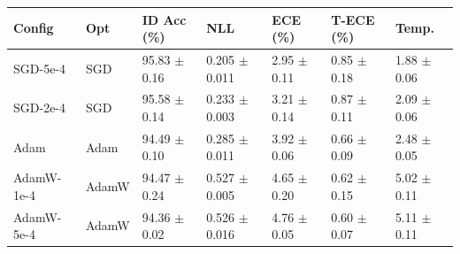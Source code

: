 \begin{tabularx}{\linewidth}{@{}l l Z Z Z Z Z@{}}
\toprule
Config & Opt & ID Acc (\%) & NLL & ECE (\%) & T-ECE (\%) & Temp. \\
\midrule
SGD-5e-4 & SGD & 95.83 $\pm$ 0.16 & 0.205 $\pm$ 0.011 & 2.95 $\pm$ 0.11 & 0.85 $\pm$ 0.18 & 1.88 $\pm$ 0.06 \\
SGD-2e-4 & SGD & 95.58 $\pm$ 0.14 & 0.233 $\pm$ 0.003 & 3.21 $\pm$ 0.14 & 0.87 $\pm$ 0.11 & 2.09 $\pm$ 0.06 \\
Adam & Adam & 94.49 $\pm$ 0.10 & 0.285 $\pm$ 0.011 & 3.92 $\pm$ 0.06 & 0.66 $\pm$ 0.09 & 2.48 $\pm$ 0.05 \\
AdamW-1e-4 & AdamW & 94.47 $\pm$ 0.24 & 0.527 $\pm$ 0.005 & 4.65 $\pm$ 0.20 & 0.62 $\pm$ 0.15 & 5.02 $\pm$ 0.11 \\
AdamW-5e-4 & AdamW & 94.36 $\pm$ 0.02 & 0.526 $\pm$ 0.016 & 4.76 $\pm$ 0.05 & 0.60 $\pm$ 0.07 & 5.11 $\pm$ 0.11 \\
\bottomrule
\end{tabularx}

